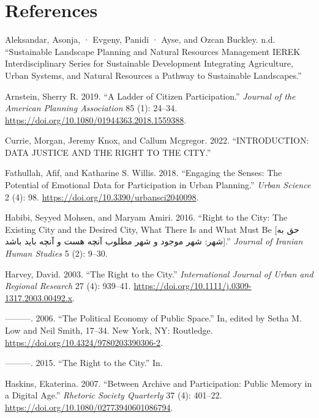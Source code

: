\documentclass[
  letterpaper,
  DIV=11,
  numbers=noendperiod]{scrartcl}
\newlength{\cslhangindent}
\newenvironment{CSLReferences}[2] %
 {\begin{list}{}{%
  \setlength{\itemindent}{0pt}
  \setlength{\leftmargin}{0pt}
  \setlength{\parsep}{0pt}
  \ifodd #1
   \setlength{\leftmargin}{\cslhangindent}
   \setlength{\itemindent}{-1\cslhangindent}
  \fi
  \setlength{\itemsep}{#2\baselineskip}}}
 {\end{list}}
\begin{document}
\newpage{}

\section*{References}\label{references}

\label{refs}
\begin{CSLReferences}{1}{0}
Aleksandar, Asonja, · Evgeny, Panidi · Ayse, and Ozcan Buckley. n.d.
{``Sustainable Landscape Planning and Natural Resources Management IEREK
Interdisciplinary Series for Sustainable Development Integrating
Agriculture, Urban Systems, and Natural Resources a Pathway to
Sustainable Landscapes.''}

Arnstein, Sherry R. 2019. {``A Ladder of Citizen Participation.''}
\emph{Journal of the American Planning Association} 85 (1): 24--34.
\url{https://doi.org/10.1080/01944363.2018.1559388}.

Currie, Morgan, Jeremy Knox, and Callum Mcgregor. 2022. {``INTRODUCTION:
DATA JUSTICE AND THE RIGHT TO THE CITY.''}

Fathullah, Afif, and Katharine S. Willis. 2018. {``Engaging the Senses:
The Potential of Emotional Data for Participation in Urban Planning.''}
\emph{Urban Science} 2 (4): 98.
\url{https://doi.org/10.3390/urbansci2040098}.

Habibi, Seyyed Mohsen, and Maryam Amiri. 2016. {``Right to the City: The
Existing City and the Desired City, What There Is and What Must Be {[}حق
به شهر: شهر موجود و شهر مطلوب آنچه هست و آنچه باید باشد{]}.''}
\emph{Journal of Iranian Human Studies} 5 (2): 9--30.

Harvey, David. 2003. {``The Right to the City.''} \emph{International
Journal of Urban and Regional Research} 27 (4): 939--41.
\url{https://doi.org/10.1111/j.0309-1317.2003.00492.x}.

---------. 2006. {``The Political Economy of Public Space.''} In, edited
by Setha M. Low and Neil Smith, 17--34. New York, NY: Routledge.
\url{https://doi.org/10.4324/9780203390306-2}.

---------. 2015. {``The Right to the City.''} In.

Haskins, Ekaterina. 2007. {``Between Archive and Participation: Public
Memory in a Digital Age.''} \emph{Rhetoric Society Quarterly} 37 (4):
401--22. \url{https://doi.org/10.1080/02773940601086794}.


\end{CSLReferences}
\end{document}
